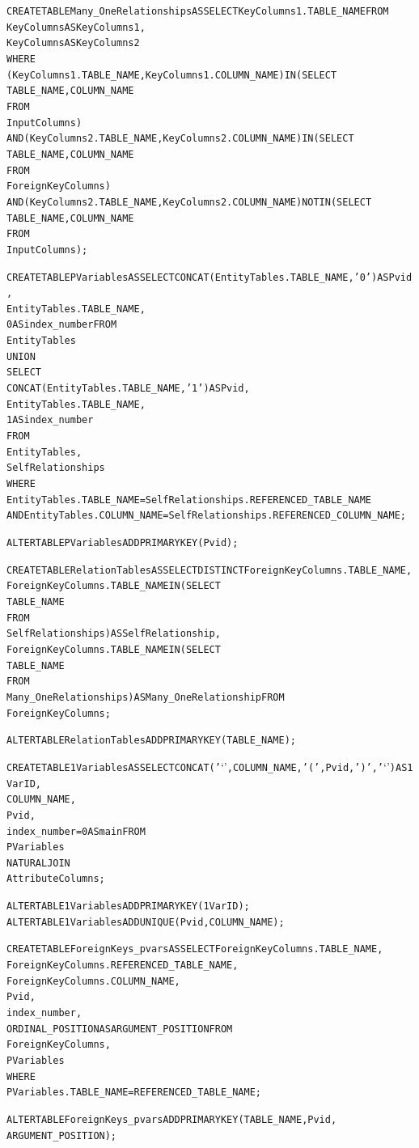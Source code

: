 \documentclass{IEEEtran}
\begin{document}
\begin{appendix}
\begin{scriptsize}
\begin{alltt}
CREATE TABLE Many_OneRelationships AS SELECT KeyColumns1.TABLE_NAME FROM
KeyColumns AS KeyColumns1,
KeyColumns AS KeyColumns2
WHERE
(KeyColumns1.TABLE_NAME , KeyColumns1.COLUMN_NAME) IN (SELECT 
        TABLE_NAME, COLUMN_NAME
    FROM
        InputColumns)
    AND (KeyColumns2.TABLE_NAME , KeyColumns2.COLUMN_NAME) IN (SELECT 
        TABLE_NAME, COLUMN_NAME
    FROM
        ForeignKeyColumns)
    AND (KeyColumns2.TABLE_NAME , KeyColumns2.COLUMN_NAME) NOT IN (SELECT 
        TABLE_NAME, COLUMN_NAME
    FROM
        InputColumns);

CREATE TABLE PVariables AS SELECT CONCAT(EntityTables.TABLE_NAME, '0') AS Pvid,
EntityTables.TABLE_NAME,
0 AS index_number FROM
EntityTables 
UNION 
SELECT 
CONCAT(EntityTables.TABLE_NAME, '1') AS Pvid,
EntityTables.TABLE_NAME,
1 AS index_number
FROM
EntityTables,
SelfRelationships
WHERE
EntityTables.TABLE_NAME = SelfRelationships.REFERENCED_TABLE_NAME
    AND EntityTables.COLUMN_NAME = SelfRelationships.REFERENCED_COLUMN_NAME ;

ALTER TABLE PVariables ADD PRIMARY KEY (Pvid);

CREATE TABLE RelationTables AS SELECT DISTINCT ForeignKeyColumns.TABLE_NAME,
ForeignKeyColumns.TABLE_NAME IN (SELECT 
        TABLE_NAME
    FROM
        SelfRelationships) AS SelfRelationship,
ForeignKeyColumns.TABLE_NAME IN (SELECT 
        TABLE_NAME
    FROM
        Many_OneRelationships) AS Many_OneRelationship FROM
ForeignKeyColumns;

ALTER TABLE RelationTables ADD PRIMARY KEY (TABLE_NAME);

CREATE TABLE 1Variables AS SELECT CONCAT('`', COLUMN_NAME, '(', Pvid, ')', '`') AS 1VarID,
COLUMN_NAME,
Pvid,
index_number = 0 AS main FROM
PVariables
    NATURAL JOIN
AttributeColumns;

ALTER TABLE 1Variables ADD PRIMARY KEY (1VarID);
ALTER TABLE 1Variables ADD UNIQUE(Pvid,COLUMN_NAME);

CREATE TABLE ForeignKeys_pvars AS SELECT ForeignKeyColumns.TABLE_NAME,
ForeignKeyColumns.REFERENCED_TABLE_NAME,
ForeignKeyColumns.COLUMN_NAME,
Pvid,
index_number,
ORDINAL_POSITION AS ARGUMENT_POSITION FROM
ForeignKeyColumns,
PVariables
WHERE
PVariables.TABLE_NAME = REFERENCED_TABLE_NAME;

ALTER TABLE ForeignKeys_pvars ADD PRIMARY KEY (TABLE_NAME,Pvid,
ARGUMENT_POSITION);


\end{alltt}
\end{scriptsize}
\end{appendix}
\end{document}
